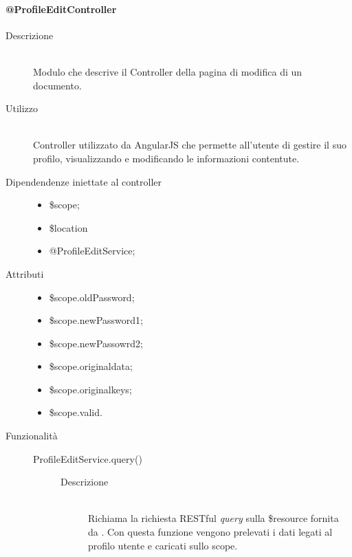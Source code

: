 \paragraph{@ProfileEditController}
\begin{description}
 \item[Descrizione] \hfill \\
 Modulo che descrive il Controller della pagina di modifica di un documento.
 
 \item[Utilizzo] \hfill \\
 Controller utilizzato da AngularJS che permette all'utente di gestire il suo profilo, visualizzando e modificando le informazioni contentute.\\ 
 \item[Dipendendenze iniettate al controller] \hfill
 \begin{itemize}
  \item \$scope;
  \item \$location
  \item @ProfileEditService;
  
 \end{itemize}
 
 \item[Attributi] \hfill
 \begin{itemize}
 \item \$scope.oldPassword;
 \item \$scope.newPassword1;
 \item \$scope.newPassowrd2;
 \item \$scope.original\textunderscore data;
 \item \$scope.original\textunderscore keys;
 \item \$scope.valid.
 \end{itemize}
 
 \item[Funzionalità] \hfill
 \begin{description}
  \item[ProfileEditService.query()] \hfill
  \begin{description}
  	\item[Descrizione] \hfill \\
   Richiama la richiesta RESTful \textit{query} sulla \$resource fornita da .
  Con questa funzione vengono prelevati i dati legati al profilo utente e caricati sullo scope.
	 
  \end{description}


\end{description}
\end{description}
